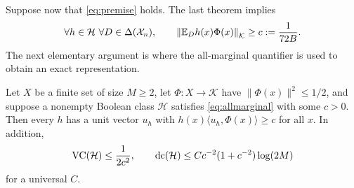 \documentclass[11pt,letterpaper,pmlr,twoside]{jmlr}
\newcommand{\X}{\mathcal X}\newcommand{\Hc}{\mathcal H}
\newcommand{\Kc}{\mathcal K}\newcommand{\sgn}{\operatorname{sign}}
\newcommand{\ip}[2]{\langle #1,#2\rangle}\newcommand{\norm}[1]{\lVert #1\rVert}
\begin{document}
Suppose now that \eqref{eq:premise} holds. The last theorem implies
\begin{equation}
 \forall h\in\Hc\ \forall D\in\Delta(\X_n),\qquad
 \left\|\E_Dh(x)\Phi(x)\right\|_{\Kc}\ge c:=\frac1{72B}.
 \label{eq:allmarginal}
\end{equation}
The next elementary argument is where the all-marginal quantifier is used to obtain an exact representation.

\begin{lemma}
\label{lem:geometry}
Let $X$ be a finite set of size $M\ge2$, let $\Phi:X\to\Kc$ have $\norm{\Phi(x)}^2\le1/2$, and suppose a nonempty Boolean class $\Hc$ satisfies \eqref{eq:allmarginal} with some $c>0$. Then every $h$ has a unit vector $u_h$ with $h(x)\ip{u_h}{\Phi(x)}\ge c$ for all $x$. In addition,
\[
 \VC(\Hc)\le\frac1{2c^2},\qquad
 \dc(\Hc)\le C c^{-2}(1+c^{-2})\log(2M)
\]
for a universal $C$.
\end{lemma}
\end{document}
